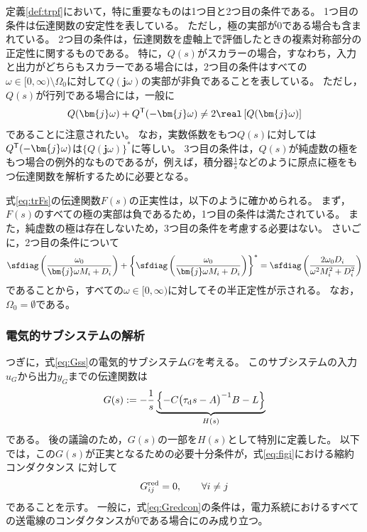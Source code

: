 \documentclass[tombow,dvipdfmx]{corona-a5}
\begin{document}
定義\ref{def:trpf}において，特に重要なものは1つ目と2つ目の条件である。
1つ目の条件は伝達関数の安定性を表している。
ただし，極の実部が0である場合も含まれている。
2つ目の条件は，伝達関数を虚軸上で評価したときの複素対称部分の正定性に関するものである。
特に，$Q(s)$がスカラーの場合，すなわち，入力と出力がどちらもスカラーである場合には，2つ目の条件はすべての$\omega \in [0,\infty)\setminus \Omega_0$に対して$Q(\bm{j}\omega)$の実部が非負であることを表している。
ただし，$Q(s)$が行列である場合には，一般に
\begin{align*}
Q(\bm{j} \omega) + Q^{\sf T}(-\bm{j} \omega) \neq 2 \real\left[ Q(\bm{j} \omega) \right]
\end{align*}
であることに注意されたい。
なお，実数係数をもつ$Q(s)$に対しては$Q^{\sf T}( -\bm{j} \omega)$は$\{Q(\bm{j} \omega)\}^*$に等しい。
3つ目の条件は，$Q(s)$が純虚数の極をもつ場合の例外的なものであるが，例えば，積分器$\frac{1}{s}$などのように原点に極をもつ伝達関数を解析するために必要となる。

式\ref{eq:trFs}の伝達関数$F(s)$の正実性は，以下のように確かめられる。
まず，$F(s)$のすべての極の実部は負であるため，1つ目の条件は満たされている。
また，純虚数の極は存在しないため，3つ目の条件を考慮する必要はない。
さいごに，2つ目の条件について
\begin{align*}
\sfdiag \left( 
\frac{\omega_0}{ \bm{j} \omega M_i + D_i}
\right)
+
\left\{
\sfdiag \left( 
\frac{\omega_0}{\bm{j} \omega M_i + D_i}
\right)
\right\}^*
=
\sfdiag \left( 
\frac{2 \omega_0 D_i}{\omega^2 M_i^2 + D_i^2}
\right)
\end{align*}
であることから，すべての$\omega\in [0,\infty)$に対してその半正定性が示される。
なお，$\Omega_0=\emptyset$である。




\subsubsection{電気的サブシステムの解析}


つぎに，式\ref{eq:Gss}の電気的サブシステム$G$を考える。
このサブシステムの入力$u_G$から出力$y_G$までの伝達関数は
\begin{align}\label{eq:trGs}
G(s) :=  - \frac{1}{s} 
\underbrace{
\left\{ -C \bigl( \tau_{\rm d} s -A \bigr)^{-1} B - L \right\}
}_{H(s)}
\end{align}
である。
後の議論のため，$G(s)$の一部を$H(s)$として特別に定義した。
以下では，この$G(s)$が正実となるための必要十分条件が，式\ref{eq:figi}における縮約コンダクタンス
に対して
\begin{align}\label{eq:Gredcon}
G^{\rm red}_{ij}=0,\qquad 
\forall i\neq j
\end{align}
であることを示す。
一般に，式\ref{eq:Gredcon}の条件は，電力系統におけるすべての送電線のコンダクタンスが0である場合にのみ成り立つ。
\end{document}
